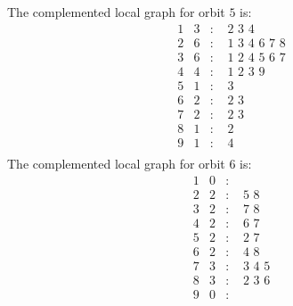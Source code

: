\documentclass[12pt]{article}
\begin{document}
The complemented local graph for orbit $5$ is:
\begin{equation*}
\begin{array}{rrcl}
1&3&:&\,\,2\,\,3\,\,4\\
2&6&:&\,\,1\,\,3\,\,4\,\,6\,\,7\,\,8\\
3&6&:&\,\,1\,\,2\,\,4\,\,5\,\,6\,\,7\\
4&4&:&\,\,1\,\,2\,\,3\,\,9\\
5&1&:&\,\,3\\
6&2&:&\,\,2\,\,3\\
7&2&:&\,\,2\,\,3\\
8&1&:&\,\,2\\
9&1&:&\,\,4\\
\end{array}
\end{equation*}
The complemented local graph for orbit $6$ is:
\begin{equation*}
\begin{array}{rrcl}
1&0&:&\\
2&2&:&\,\,5\,\,8\\
3&2&:&\,\,7\,\,8\\
4&2&:&\,\,6\,\,7\\
5&2&:&\,\,2\,\,7\\
6&2&:&\,\,4\,\,8\\
7&3&:&\,\,3\,\,4\,\,5\\
8&3&:&\,\,2\,\,3\,\,6\\
9&0&:&\\
\end{array}
\end{equation*}
\end{document}
